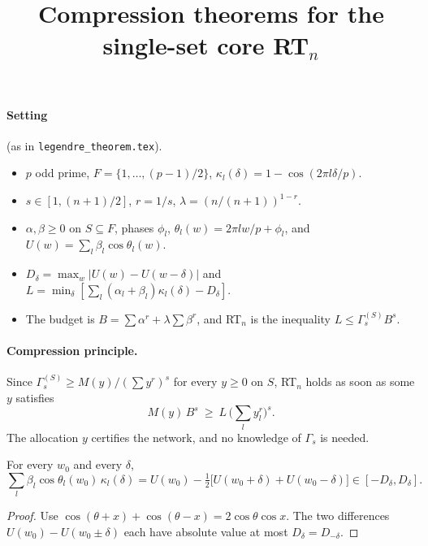 \documentclass[11pt]{article}
\title{Compression theorems for the single-set core RT$_n$}
\date{}
\theoremstyle{remark}\newtheorem{remark}[theorem]{Remark}
\begin{document}
\maketitle

\paragraph{Setting} (as in \texttt{legendre\_theorem.tex}).
\begin{itemize}
\item $p$ odd prime, $F=\{1,\dots,(p-1)/2\}$, $\kappa_l(\delta)=1-\cos(2\pi l\delta/p)$.
\item $s\in[1,(n+1)/2]$, $r=1/s$, $\lambda=(n/(n+1))^{1-r}$.
\item $\alpha,\beta\ge0$ on $S\subseteq F$, phases $\phi_l$, $\theta_l(w)=2\pi lw/p+\phi_l$, and
$U(w)=\sum_l\beta_l\cos\theta_l(w)$.
\item $D_\delta=\max_w|U(w)-U(w-\delta)|$ and $L=\min_\delta[\sum_l(\alpha_l+\beta_l)\kappa_l(\delta)-D_\delta]$.
\item The budget is $B=\sum\alpha^r+\lambda\sum\beta^r$, and RT$_n$ is the inequality $L\le\Gamma^{(S)}_sB^s$.
\end{itemize}

\paragraph{Compression principle.}
Since $\Gamma^{(S)}_s\ge M(y)/(\sum y^r)^s$ for every $y\ge0$ on $S$, RT$_n$ holds as soon as some $y$ satisfies
\[ M(y)\,B^s\ \ge\ L\,\Big(\sum_l y_l^r\Big)^s .\tag{C}\]
The allocation $y$ certifies the network, and no knowledge of $\Gamma_s$ is needed.

\begin{lemma}\label{lem:id}
For every $w_0$ and every $\delta$,
\[\sum_l\beta_l\cos\theta_l(w_0)\,\kappa_l(\delta)=U(w_0)-\tfrac12\big[U(w_0+\delta)+U(w_0-\delta)\big]\in[-D_\delta,D_\delta].\]
\end{lemma}
\begin{proof}
Use $\cos(\theta+x)+\cos(\theta-x)=2\cos\theta\cos x$. The two differences $U(w_0)-U(w_0\pm\delta)$ each have absolute
value at most $D_\delta=D_{-\delta}$.
\end{proof}
\end{document}
